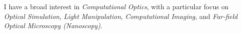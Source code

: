 I have a broad interest in \textit{Computational Optics}, with a particular focus on \textit{Optical Simulation}, \textit{Light Manipulation}, \textit{Computational Imaging}, and \textit{Far-field Optical Microscopy (Nanoscopy)}.